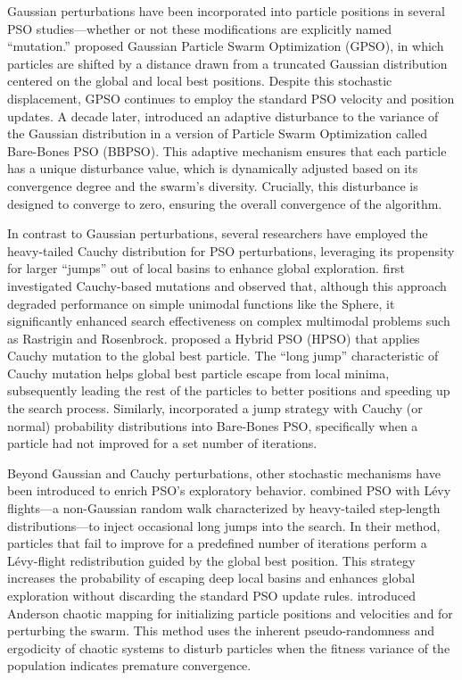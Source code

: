 {Gaussian perturbations have been incorporated into particle positions in several PSO studies---whether or not these modifications are explicitly named ``mutation.''
\citet{secrest2003gaussian} proposed Gaussian Particle Swarm Optimization (GPSO), in which particles are shifted by a distance drawn from a truncated Gaussian distribution centered on the global and local best positions. Despite this stochastic displacement, GPSO continues to employ the standard PSO velocity and position updates.
A decade later, \citet{zhang2014adaptive} introduced an adaptive disturbance to the variance of the Gaussian distribution in a version of Particle Swarm Optimization called Bare-Bones PSO (BBPSO). This adaptive mechanism ensures that each particle has a unique disturbance value, which is dynamically adjusted based on its convergence degree and the swarm's diversity. Crucially, this disturbance is designed to converge to zero, ensuring the overall convergence of the algorithm.

In contrast to Gaussian perturbations, several researchers have employed the heavy\--tailed Cauchy distribution for PSO perturbations, leveraging its propensity for larger ``jumps'' out of local basins to enhance global exploration.
\citet{stacey2003mutation} first investigated Cauchy-based mutations and observed that, although this approach degraded performance on simple unimodal functions like the Sphere, it significantly enhanced search effectiveness on complex multimodal problems such as Rastrigin and Rosenbrock.
\citet{wang2007cauchy} proposed a Hybrid PSO (HPSO) that applies Cauchy mutation to the global best particle. The ``long jump'' characteristic of Cauchy mutation helps global best particle escape from local minima, subsequently leading the rest of the particles to better positions and speeding up the search process.
Similarly, \citet{krohling2009barebones} incorporated a jump strategy with Cauchy (or normal) probability distributions into Bare-Bones PSO, specifically when a particle had not improved for a set number of iterations.

Beyond Gaussian and Cauchy perturbations, other stochastic mechanisms have been introduced to enrich PSO’s exploratory behavior.
\citet{hakli2014levy} combined PSO with Lévy flights---a non-Gaussian random walk characterized by heavy-tailed step-length distributions---to inject occasional long jumps into the search. In their method, particles that fail to improve for a predefined number of iterations perform a Lévy-flight redistribution guided by the global best position. This strategy increases the probability of escaping deep local basins and enhances global exploration without discarding the standard PSO update rules.
\citet{yong2015adaptive} introduced Anderson chaotic mapping for initializing particle positions and velocities and for perturbing the swarm. This method uses the inherent pseudo-randomness and ergodicity of chaotic systems to disturb particles when the fitness variance of the population indicates premature convergence.

}

